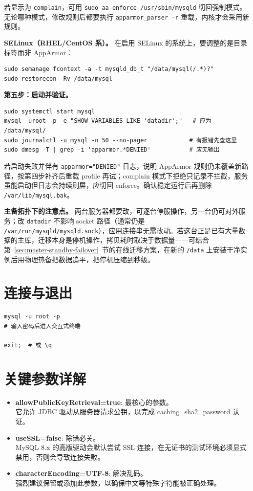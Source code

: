 \documentclass[12pt,UTF8]{ctexbook}
\begin{document}
若显示为 \texttt{complain}，可用 \texttt{sudo aa-enforce /usr/sbin/mysqld} 切回强制模式。无论哪种模式，修改规则后都要执行 \texttt{apparmor\_parser -r} 重载，内核才会采用新规则。

\textbf{SELinux（RHEL/CentOS 系）。} 在启用 SELinux 的系统上，要调整的是目录标签而非 AppArmor：

\begin{lstlisting}
sudo semanage fcontext -a -t mysqld_db_t "/data/mysql(/.*)?"
sudo restorecon -Rv /data/mysql
\end{lstlisting}

\textbf{第五步：启动并验证。}

\begin{lstlisting}
sudo systemctl start mysql
mysql -uroot -p -e "SHOW VARIABLES LIKE 'datadir';"   # 应为 /data/mysql/
sudo journalctl -u mysql -n 50 --no-pager            # 有报错先查这里
sudo dmesg -T | grep -i 'apparmor.*DENIED'           # 应无输出
\end{lstlisting}

若启动失败并伴有 \texttt{apparmor="DENIED"} 日志，说明 AppArmor 规则仍未覆盖新路径，按第四步补齐后重载 profile 再试；complain 模式下拒绝只记录不拦截，服务虽能启动但日志会持续刷屏，应切回 enforce。确认稳定运行后再删除 \texttt{/var/lib/mysql.bak}。

\textbf{主备拓扑下的注意点。} 两台服务器都要改，可逐台停服操作，另一台仍可对外服务；改 \texttt{datadir} 不影响 socket 路径（通常仍是 \texttt{/var/run/mysqld/mysqld.sock}），应用连接串无需改动。若这台正是已有大量数据的主库，迁移本身是停机操作，拷贝耗时取决于数据量——可结合第~\ref{sec:master-standby-failover}~节的在线迁移方案，在新的 \texttt{/data} 上安装干净实例后用物理热备把数据追平，把停机压缩到秒级。

\section{连接与退出}

\begin{lstlisting}
mysql -u root -p
# 输入密码后进入交互式终端

exit;  # 或 \q
\end{lstlisting}

\section{关键参数详解}

\begin{itemize}
\item \textbf{allowPublicKeyRetrieval=true}: 最核心的参数。\\
	它允许 JDBC 驱动从服务器请求公钥，以完成 caching\_sha2\_password 认证。
	
\item \textbf{useSSL=false}: 除错必关。\\
	MySQL 8.x 的高版驱动会默认尝试 SSL 连接，在无证书的测试环境必须显式禁用，否则会导致连接失败。
	
\item \textbf{characterEncoding=UTF-8}: 解决乱码。\\
	强烈建议保留或添加此参数，以确保中文等特殊字符能被正确处理。
\end{itemize}
\end{document}
